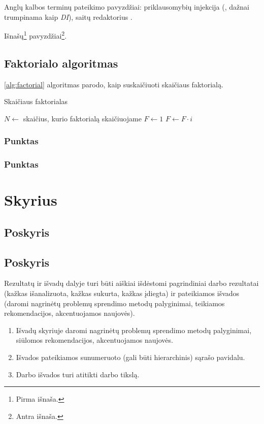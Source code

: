 \documentclass[
    english, %
]{VUMIFPSkursinis}
\begin{document}
Anglų kalbos terminų pateikimo pavyzdžiai: priklausomybių injekcija (,
dažnai trumpinama kaip \textit{DI}), saitų redaktorius .

Išnašų\footnote{Pirma išnaša.} pavyzdžiai\footnote{Antra išnaša.}.

\subsection{Faktorialo algoritmas}

\ref{alg:factorial} algoritmas parodo, kaip suskaičiuoti skaičiaus faktorialą.

\begin{algorithm}
\caption{Skaičiaus faktorialas}
\begin{algorithmic}[1] %
\State $N\gets$ skaičius, kurio faktorialą skaičiuojame
\State $F\gets 1$
    \State $F\gets F \cdot i$
\EndFor
\end{algorithmic}
\label{alg:factorial}
\end{algorithm}

\subsubsection{Punktas}
\subsubsection{Punktas}
\section{Skyrius}
\subsection{Poskyris}
\subsection{Poskyris}

Rezultatų ir išvadų dalyje turi būti aiškiai išdėstomi pagrindiniai darbo
rezultatai (kažkas išanalizuota, kažkas sukurta, kažkas įdiegta) ir pateikiamos
išvados (daromi nagrinėtų problemų sprendimo metodų palyginimai, teikiamos
rekomendacijos, akcentuojamos naujovės).

\begin{enumerate}[labelindent=0pt]
    \item Išvadų skyriuje daromi nagrinėtų problemų sprendimo metodų palyginimai, siūlomos
rekomendacijos, akcentuojamos naujovės.
    \item Išvados pateikiamos sunumeruoto (gali būti hierarchinis) sąrašo pavidalu.
    \item Darbo išvados turi atitikti darbo tikslą.
\end{enumerate}
\end{document}
